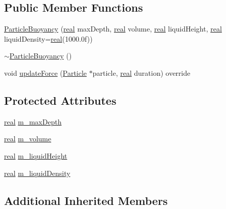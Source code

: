 \subsection*{Public Member Functions}
\begin{DoxyCompactItemize}
\item 
\mbox{\hyperlink{classrum_1_1_particle_buoyancy_a25df269bba530e8275ee0e22e9fce166}{Particle\+Buoyancy}} (\mbox{\hyperlink{namespacerum_a7e8cca23573d5eaead0f138cbaa4862c}{real}} max\+Depth, \mbox{\hyperlink{namespacerum_a7e8cca23573d5eaead0f138cbaa4862c}{real}} volume, \mbox{\hyperlink{namespacerum_a7e8cca23573d5eaead0f138cbaa4862c}{real}} liquid\+Height, \mbox{\hyperlink{namespacerum_a7e8cca23573d5eaead0f138cbaa4862c}{real}} liquid\+Density=\mbox{\hyperlink{namespacerum_a7e8cca23573d5eaead0f138cbaa4862c}{real}}(1000.\+0f))
\item 
\mbox{\hyperlink{classrum_1_1_particle_buoyancy_a892e6f064e5eb1be8e7d2af8c76b856c}{$\sim$\+Particle\+Buoyancy}} ()
\item 
void \mbox{\hyperlink{classrum_1_1_particle_buoyancy_a192992c47ce2b47fd06d0224e0cf86f4}{update\+Force}} (\mbox{\hyperlink{classrum_1_1_particle}{Particle}} $\ast$particle, \mbox{\hyperlink{namespacerum_a7e8cca23573d5eaead0f138cbaa4862c}{real}} duration) override
\end{DoxyCompactItemize}
\subsection*{Protected Attributes}
\begin{DoxyCompactItemize}
\item 
\mbox{\hyperlink{namespacerum_a7e8cca23573d5eaead0f138cbaa4862c}{real}} \mbox{\hyperlink{classrum_1_1_particle_buoyancy_af29f25245a785fc1bceafeac08728370}{m\+\_\+max\+Depth}}
\item 
\mbox{\hyperlink{namespacerum_a7e8cca23573d5eaead0f138cbaa4862c}{real}} \mbox{\hyperlink{classrum_1_1_particle_buoyancy_acb0a75c58de8ddede0b4be9939917c32}{m\+\_\+volume}}
\item 
\mbox{\hyperlink{namespacerum_a7e8cca23573d5eaead0f138cbaa4862c}{real}} \mbox{\hyperlink{classrum_1_1_particle_buoyancy_a220309bad493fc0d090bd3e91d9f4acb}{m\+\_\+liquid\+Height}}
\item 
\mbox{\hyperlink{namespacerum_a7e8cca23573d5eaead0f138cbaa4862c}{real}} \mbox{\hyperlink{classrum_1_1_particle_buoyancy_a8e347c9390d2eb5e4340f6e3c9d8d332}{m\+\_\+liquid\+Density}}
\end{DoxyCompactItemize}
\subsection*{Additional Inherited Members}



